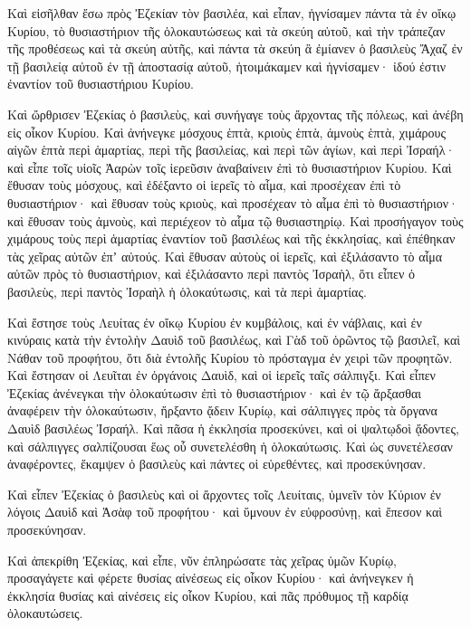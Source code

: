 {\par }{\PP {}Καὶ εἰσῆλθαν ἔσω πρὸς Ἐζεκίαν τὸν βασιλέα, καὶ εἶπαν, ἡγνίσαμεν πάντα τὰ ἐν οἴκῳ Κυρίου, τὸ θυσιαστήριον τῆς ὁλοκαυτώσεως καὶ τὰ σκεύη αὐτοῦ, καὶ τὴν τράπεζαν τῆς προθέσεως καὶ τὰ σκεύη αὐτῆς,
καὶ πάντα τὰ σκεύη ἃ ἐμίανεν ὁ βασιλεὺς Ἄχαζ ἐν τῇ βασιλείᾳ αὐτοῦ ἐν τῇ ἀποστασίᾳ αὐτοῦ, ἡτοιμάκαμεν καὶ ἡγνίσαμεν· ἰδού ἐστιν ἐναντίον τοῦ θυσιαστήριου Κυρίου.
\par }{\PP {}Καὶ ὤρθρισεν Ἐζεκίας ὁ βασιλεὺς, καὶ συνήγαγε τοὺς ἄρχοντας τῆς πόλεως, καὶ ἀνέβη εἰς οἶκον Κυρίου.
Καὶ ἀνήνεγκε μόσχους ἑπτὰ, κριοὺς ἑπτὰ, ἀμνοὺς ἑπτὰ, χιμάρους αἰγῶν ἑπτὰ περὶ ἁμαρτίας, περὶ τῆς βασιλείας, καὶ περὶ τῶν ἁγίων, καὶ περὶ Ἰσραήλ· καὶ εἶπε τοῖς υἱοῖς Ἀαρὼν τοῖς ἱερεῦσιν ἀναβαίνειν ἐπὶ τὸ θυσιαστήριον Κυρίου.
Καὶ ἔθυσαν τοὺς μόσχους, καὶ ἐδέξαντο οἱ ἱερεῖς τὸ αἷμα, καὶ προσέχεαν ἐπὶ τὸ θυσιαστήριον· καὶ ἔθυσαν τοὺς κριοὺς, καὶ προσέχεαν τὸ αἷμα ἐπὶ τὸ θυσιαστήριον· καὶ ἔθυσαν τοὺς ἀμνοὺς, καὶ περιέχεον τὸ αἷμα τῷ θυσιαστηρίῳ.
Καὶ προσήγαγον τοὺς χιμάρους τοὺς περὶ ἁμαρτίας ἐναντίον τοῦ βασιλέως καὶ τῆς ἐκκλησίας, καὶ ἐπέθηκαν τὰς χεῖρας αὐτῶν ἐπʼ αὐτούς.
Καὶ ἔθυσαν αὐτοὺς οἱ ἱερεῖς, καὶ ἐξιλάσαντο τὸ αἷμα αὐτῶν πρὸς τὸ θυσιαστήριον, καὶ ἐξιλάσαντο περὶ παντὸς Ἰσραὴλ, ὅτι εἶπεν ὁ βασιλεὺς, περὶ παντὸς Ἰσραὴλ ἡ ὁλοκαύτωσις, καὶ τὰ περὶ ἁμαρτίας.
\par }{\PP {}Καὶ ἔστησε τοὺς Λευίτας ἐν οἴκῳ Κυρίου ἐν κυμβάλοις, καὶ ἐν νάβλαις, καὶ ἐν κινύραις κατὰ τὴν ἐντολὴν Δαυὶδ τοῦ βασιλέως, καὶ Γὰδ τοῦ ὁρῶντος τῷ βασιλεῖ, καὶ Νάθαν τοῦ προφήτου, ὅτι διὰ ἐντολῆς Κυρίου τὸ πρόσταγμα ἐν χειρὶ τῶν προφητῶν.
Καὶ ἔστησαν οἱ Λευῖται ἐν ὀργάνοις Δαυὶδ, καὶ οἱ ἱερεῖς ταῖς σάλπιγξι.
Καὶ εἶπεν Ἐζεκίας ἀνένεγκαι τὴν ὁλοκαύτωσιν ἐπὶ τὸ θυσιαστήριον· καὶ ἐν τῷ ἄρξασθαι ἀναφέρειν τὴν ὁλοκαύτωσιν, ἤρξαντο ᾄδειν Κυρίῳ, καὶ σάλπιγγες πρὸς τὰ ὄργανα Δαυὶδ βασιλέως Ἰσραήλ.
Καὶ πᾶσα ἡ ἐκκλησία προσεκύνει, καὶ οἱ ψαλτῳδοὶ ᾄδοντες, καὶ σάλπιγγες σαλπίζουσαι ἕως οὗ συνετελέσθη ἡ ὁλοκαύτωσις.
Καὶ ὡς συνετέλεσαν ἀναφέροντες, ἔκαμψεν ὁ βασιλεὺς καὶ πάντες οἱ εὑρεθέντες, καὶ προσεκύνησαν.
\par }{\PP {}Καὶ εἶπεν Ἐζεκίας ὁ βασιλεὺς καὶ οἱ ἄρχοντες τοῖς Λευίταις, ὑμνεῖν τὸν Κύριον ἐν λόγοις Δαυὶδ καὶ Ἀσὰφ τοῦ προφήτου· καὶ ὕμνουν ἐν εὐφροσύνῃ, καὶ ἔπεσον καὶ προσεκύνησαν.
\par }{\PP {}Καὶ ἀπεκρίθη Ἐζεκίας, καὶ εἶπε, νῦν ἐπληρώσατε τὰς χεῖρας ὑμῶν Κυρίῳ, προσαγάγετε καὶ φέρετε θυσίας αἰνέσεως εἰς οἶκον Κυρίου· καὶ ἀνήνεγκεν ἡ ἐκκλησία θυσίας καὶ αἰνέσεις εἰς οἶκον Κυρίου, καὶ πᾶς πρόθυμος τῇ καρδίᾳ ὁλοκαυτώσεις.
}
